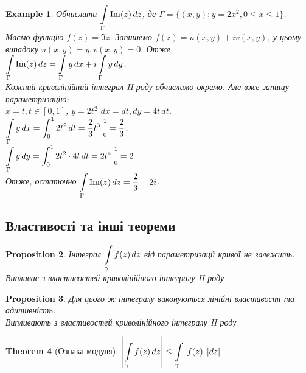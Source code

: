\documentclass[a4paper, 10pt]{article}
\theoremstyle{theoremdd}
\newtheorem{theorem}{Theorem}[subsection]
\theoremstyle{theoremdd}
\theoremstyle{theoremdd}
\theoremstyle{theoremdd}
\newtheorem{example}[theorem]{Example}
\theoremstyle{theoremdd}
\newtheorem{proposition}[theorem]{Proposition}
\theoremstyle{theoremdd}
\theoremstyle{theoremdd}
\theoremstyle{theoremdd}
\begin{document}
\begin{example}
Обчислити $\displaystyle\int\displaylimits_{\Gamma} \operatorname{Im}(z) \,dz$, де  $\Gamma=\{(x,y): y=2x^2, 0 \leq x \leq 1 \}$.\\
Маємо функцію $f(z) = \Im z$. Запишемо $f(z) = u(x,y) + iv(x,y)$, у цьому випадоку $u(x,y) = y, v(x,y) = 0$. Отже,\\
$\displaystyle\int\displaylimits_{\Gamma} \operatorname{Im}(z) \,dz = \int\displaylimits_{\Gamma} y\,dx + i \int\displaylimits_{\Gamma}y\,dy$.\\
Кожний криволінійний інтеграл II роду обчислимо окремо. Але вже запишу параметризацію:\\
$x = t, t \in [0,1]$, $y = 2t^2$ \hspace{1cm} $dx = dt, dy = 4t\,dt$.\\
$\displaystyle\int\displaylimits_{\Gamma} y\,dx = \int_0^1 2t^2\,dt = \dfrac{2}{3}t^3\Big|_{0}^1 = \dfrac{2}{3}$.\\
$\displaystyle\int\displaylimits_{\Gamma} y\,dy = \int_0^1 2t^2 \cdot 4t\,dt = 2t^4\Big|_{0}^1 = 2$.\\
Отже, остаточно $\displaystyle\int\displaylimits_{\Gamma} \operatorname{Im}(z) \,dz = \dfrac{2}{3} + 2i$.
\end{example}
	
\subsection{Властивості та інші теореми}
\begin{proposition}
Інтеграл $\displaystyle \int\displaylimits_{\gamma} f(z)\,dz$ від параметризації кривої не залежить.\\
\textit{Випливає з властивостей криволінійного інтегралу II роду}
\end{proposition}

\begin{proposition}
Для цього ж інтегралу  виконуються лінійні властивості та адитивність.\\
\textit{Випливають з властивостей криволінійного інтегралу II роду}
\end{proposition}

\begin{theorem}[Ознака модуля]
$\displaystyle \left\lvert\int\displaylimits_{\gamma} f(z)\,dz \right\rvert \leq \int\displaylimits_{\gamma} |f(z)| \,|dz|$
\end{theorem}
\end{document}
